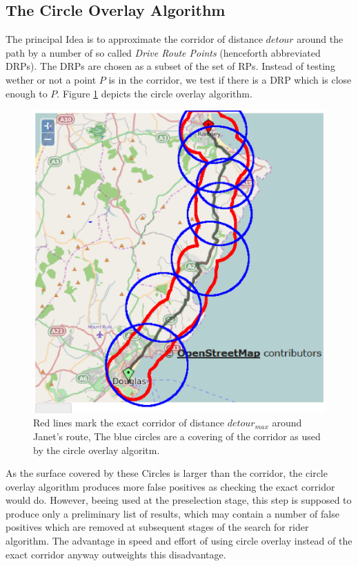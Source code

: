 \subsection{The Circle Overlay Algorithm}
\label{sfrDriveRoutePoints}
\label{sfrCircleOverlayAlgorithm}
The principal Idea is to approximate the corridor of distance $detour$ around the path by a  number of
so called \emph{Drive Route Points} (henceforth abbreviated DRPs). 
The DRPs are chosen as a subset of the set of RPs. 
Instead of testing wether or not a point $P$ is in the corridor, we test if there is a DRP  which is close enough to $P$.
Figure \ref{pic:circleOverlayAlgorithmImage} depicts the circle overlay algorithm.

	\begin{figure}[t]
	\includegraphics[scale=0.5]{images/maps_drp/02-OSM-DouglasToRamsay.corridor.eps}
	\caption{Red lines mark the exact corridor of distance $detour_{max}$ around Janet's route,
	         The blue circles are a covering of the corridor as used by the circle overlay algoritm.
		 }
	\label{pic:circleOverlayAlgorithmImage}
	\end{figure}

As the surface covered by these Circles is larger than the corridor, the circle overlay algorithm produces more false
positives as checking the exact corridor would do. However, beeing used at the preselection stage, this step 
is supposed to produce only a preliminary list of results, which may contain a number of 
false positives which are removed at subsequent stages of the search for rider algorithm.
The advantage in speed and effort of using circle overlay instead of the exact corridor anyway outweights this disadvantage.

